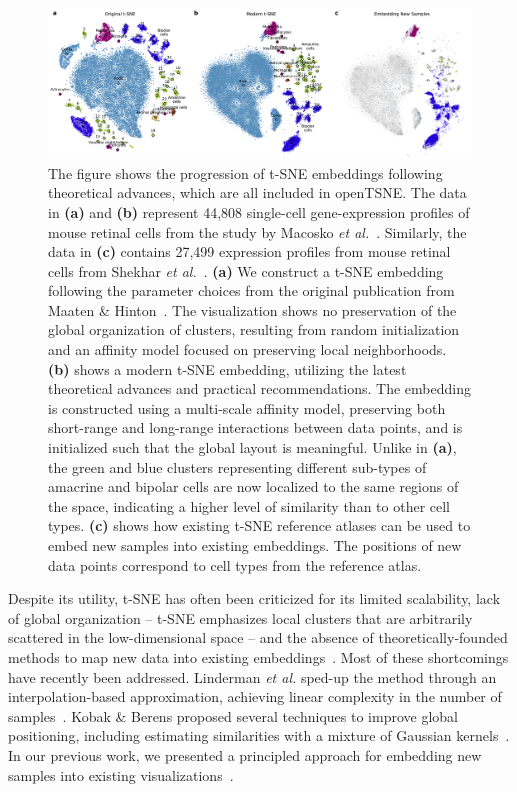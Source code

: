 \documentclass[twocolumn]{bmcart}
\newcommand{\opentsne}{\textsf{openTSNE}}
\begin{document}
\begin{figure}[htbp]
  \includegraphics[width=\textwidth]{macosko2015}
  \caption{\label{fig:macosko}The figure shows the progression of t-SNE
	embeddings following theoretical advances, which are all included in
	\opentsne. The data in \textbf{(a)} and \textbf{(b)} represent 44,808
	single-cell gene-expression profiles of mouse retinal cells from the
	study by Macosko \textit{et al.}~\cite{macosko2015highly}. Similarly,
	the data in \textbf{(c)} contains 27,499 expression profiles from mouse
	retinal cells from Shekhar \textit{et
	al.}~\cite{shekhar2016comprehensive}. \textbf{(a)} We construct a t-SNE
	embedding following the parameter choices from the original publication
	from Maaten \& Hinton~\cite{maaten2008visualizing}. The visualization
	shows no preservation of the global organization of clusters,
	resulting from random initialization and an affinity model focused on
	preserving local neighborhoods. \textbf{(b)} shows a modern t-SNE
	embedding, utilizing the latest theoretical advances and practical
	recommendations. The embedding is constructed using a multi-scale
	affinity model, preserving both short-range and long-range interactions
	between data points, and is initialized such that the global layout is
	meaningful. Unlike in \textbf{(a)}, the green and blue clusters
	representing different sub-types of amacrine and bipolar cells are now
	localized to the same regions of the space, indicating a higher level
	of similarity than to other cell types. \textbf{(c)} shows how existing
	t-SNE reference atlases can be used to embed new samples into existing
	embeddings. The positions of new data points correspond to cell types
	from the reference atlas.}
\end{figure}

Despite its utility, t-SNE has often been criticized for its limited scalability, lack of global organization -- t-SNE emphasizes
local clusters that are arbitrarily scattered in the low-dimensional space --
and the absence of theoretically-founded methods to map new data into
existing embeddings~\cite{ding2018interpretable,becht2019dimensionality}. Most
of these shortcomings have recently been addressed. Linderman \textit{et al.}
sped-up the method through an interpolation-based approximation, achieving linear complexity in the number of
samples~\cite{linderman2019fast}. Kobak \& Berens proposed several techniques
to improve global positioning, including estimating similarities with a mixture
of Gaussian kernels~\cite{kobak2019art}. In our previous work, we presented a
principled approach for embedding new samples into existing
visualizations~\cite{policar2019embedding}.
\end{document}
